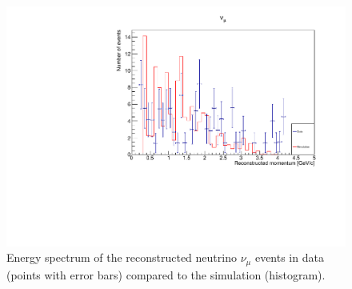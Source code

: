 \begin{figure}[h!]
\centering
\includegraphics[width=.9\textwidth]{figures/NeutrinoChap/nuEventNewest.pdf}
\caption{Energy spectrum of the reconstructed neutrino $\nu_\mu$ events in data (points with error bars) compared to the simulation (histogram).}
\label{fig:datanumu}
\end{figure}
















